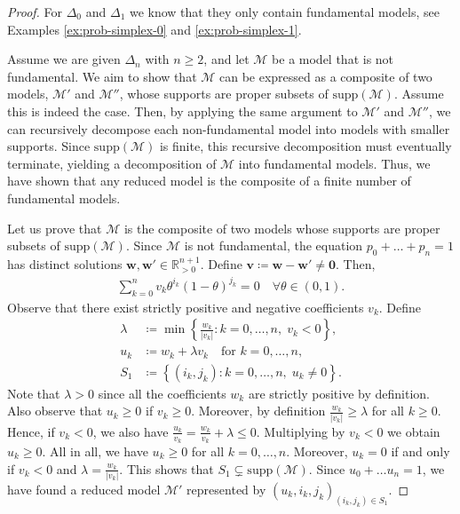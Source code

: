\begin{proof}
    For \( \Delta_0 \) and \( \Delta_1 \) we know that they only contain fundamental models, see Examples \ref{ex:prob-simplex-0} and \ref{ex:prob-simplex-1}. 
    
    Assume we are given \( \Delta_n \) with \( n \geq 2 \), and let \( \mathcal{M} \) be a model that is not fundamental. We aim to show that \( \mathcal{M} \) can be expressed as a composite of two models, \( \mathcal{M}' \) and \( \mathcal{M}'' \), whose supports are proper subsets of \( \mathrm{supp}(\mathcal{M}) \). Assume this is indeed the case. Then, by applying the same argument to \( \mathcal{M}' \) and \( \mathcal{M}'' \), we can recursively decompose each non-fundamental model into models with smaller supports. Since \( \mathrm{supp}(\mathcal{M}) \) is finite, this recursive decomposition must eventually terminate, yielding a decomposition of \( \mathcal{M} \) into fundamental models. Thus, we have shown that any reduced model is the composite of a finite number of fundamental models. 

    Let us prove that \( \mathcal{M} \) is the composite of two models whose supports are proper subsets of \( \mathrm{supp}(\mathcal{M}) \). Since \( \mathcal{M} \) is not fundamental, the equation \( p_0 + \dots + p_n = 1 \) has distinct solutions \( \mathbf w, \mathbf w' \in \mathbb{R}^{n+1}_{> 0} \). Define \( \mathbf v \coloneqq \mathbf w - \mathbf w' \neq \mathbf 0 \). Then, 
    \begin{align*}
        \sum_{k=0}^n v_k \theta^{i_k}(1-\theta)^{j_k} = 0 \quad \forall \theta \in (0,1).
    \end{align*}
    Observe that there exist strictly positive and negative coefficients \( v_k \). Define 
    \begin{align*}
        \lambda &\coloneqq \min \left\{ \frac{w_k}{\lvert v_k \rvert} : k = 0, \dots, n, \; v_k < 0 \right\}, \\
        u_k &\coloneqq w_k + \lambda v_k \quad \text{for } k = 0, \dots, n, \\
        S_1 &\coloneqq \left\{ (i_k, j_k) : k=0, \dots, n, \; u_k \neq 0 \right\}.
    \end{align*}
    Note that \( \lambda > 0 \) since all the coefficients \( w_k \) are strictly positive by definition. Also observe that \( u_k \geq 0 \) if \( v_k \geq 0 \). Moreover, by definition \( \frac{w_k}{\lvert v_k \rvert} \geq \lambda \) for all \( k \geq 0 \). Hence, if \( v_k < 0 \), we also have \( \frac{u_k}{v_k} = \frac{w_k}{v_k} + \lambda  \leq 0\). Multiplying by \( v_k < 0 \) we obtain \( u_k \geq 0 \). All in all, we have \( u_k \geq 0 \) for all \( k = 0, \dots, n \). Moreover, \( u_k = 0 \) if and only if \( v_k < 0 \) and \( \lambda = \frac{w_k}{\lvert v_k \rvert} \). This shows that \( S_1 \subsetneq \mathrm{supp}(\mathcal{M}) \). Since \( u_0 + \dots u_n = 1 \), we have found a reduced model \( \mathcal{M}' \) represented by \( (u_k, i_k, j_k)_{(i_k,j_k) \in S_1} \).


\end{proof}
